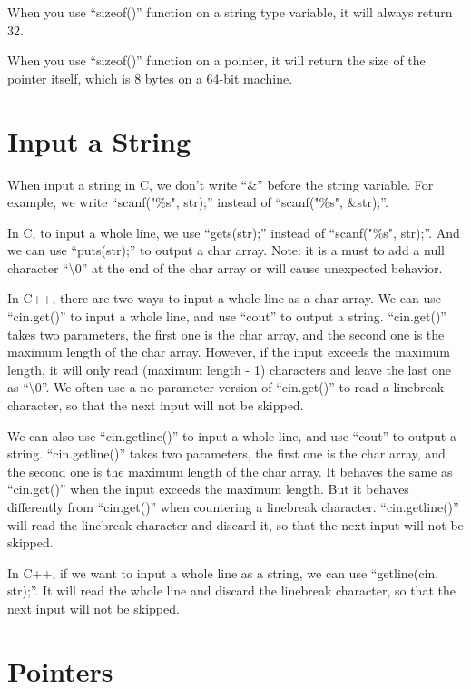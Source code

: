 \documentclass[a4paper,12pt]{article}
\begin{document}
When you use ``sizeof()'' function on a string type variable, it will always return 32.

When you use ``sizeof()'' function on a pointer, it will return the size of the pointer itself, which is 8 bytes on a 64-bit machine.

\section*{Input a String}

When input a string in C, we don't write ``\&'' before the string variable. 
For example, we write ``scanf("\%s", str);'' instead of ``scanf("\%s", \&str);''.

In C, to input a whole line, we use ``gets(str);'' instead of ``scanf("\%s", str);''.
And we can use ``puts(str);'' to output a char array.
Note: it is a must to add a null character ``\textbackslash 0'' at the end of the char array or will cause unexpected behavior.

In C++, there are two ways to input a whole line as a char array.
We can use ``cin.get()'' to input a whole line, and use ``cout'' to output a string.
``cin.get()'' takes two parameters, the first one is the char array, and the second one is the maximum length of the char array.
However, if the input exceeds the maximum length, it will only read (maximum length - 1) characters and leave the last one as ``\textbackslash 0''.
We often use a no parameter version of ``cin.get()'' to read a linebreak character, so that the next input will not be skipped.

We can also use ``cin.getline()'' to input a whole line, and use ``cout'' to output a string.
``cin.getline()'' takes two parameters, the first one is the char array, and the second one is the maximum length of the char array.
It behaves the same as ``cin.get()'' when the input exceeds the maximum length.
But it behaves differently from ``cin.get()'' when countering a linebreak character.
``cin.getline()'' will read the linebreak character and discard it, so that the next input will not be skipped.

In C++, if we want to input a whole line as a string, we can use ``getline(cin, str);''.
It will read the whole line and discard the linebreak character, so that the next input will not be skipped.

\section*{Pointers}
\end{document}
